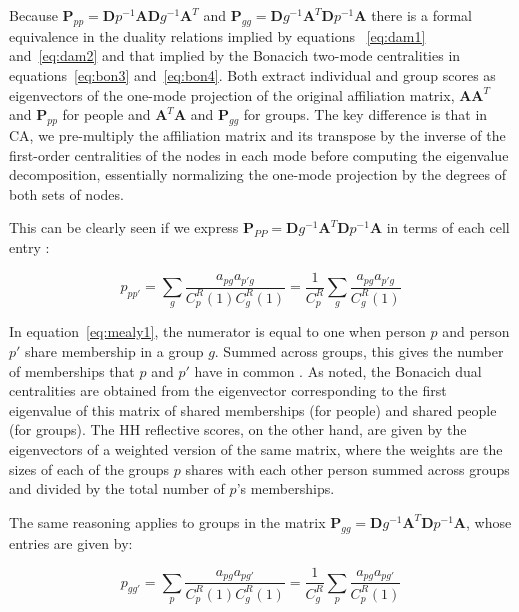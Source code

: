 \documentclass[a4paper,fleqn]{cas-sc}
\begin{document}
Because $\mathbf{P}_{pp} = \mathbf{D}p^{-1}\mathbf{A}\mathbf{D}g^{-1}\mathbf{A}^T$ and $\mathbf{P}_{gg} = \mathbf{D}g^{-1}\mathbf{A}^T\mathbf{D}p^{-1}\mathbf{A}$ there is a formal equivalence in the duality relations implied by equations ~\ref{eq:dam1} and~\ref{eq:dam2} and that implied by the Bonacich two-mode centralities in equations~\ref{eq:bon3} and~\ref{eq:bon4}. Both extract individual and group scores as eigenvectors of the one-mode projection of the original affiliation matrix, $\mathbf{AA}^T$ and $\mathbf{P}_{pp}$ for people and $\mathbf{A}^T\mathbf{A}$ and $\mathbf{P}_{gg}$ for groups. The key difference is that in CA, we pre-multiply the affiliation matrix and its transpose by the inverse of the first-order centralities of the nodes in each mode before computing the eigenvalue decomposition, essentially normalizing the one-mode projection by the degrees of both sets of nodes. 

This can be clearly seen if we express $\mathbf{P}_{PP}= \mathbf{D}g^{-1}\mathbf{A}^T\mathbf{D}p^{-1}\mathbf{A}$ in terms of each cell entry \cite[eq. 4]{mealy2019interpreting}:

\begin{equation}
    p_{pp'} = \sum_g\frac{a_{pg}a_{p'g}}{C^R_p(1)C^R_g(1)} = 
    \frac{1}{C^R_p}\sum_g\frac{a_{pg}a_{p'g}}{C^R_g(1)}
    \label{eq:mealy1}
\end{equation}

In equation~\ref{eq:mealy1}, the numerator is equal to one when person $p$ and person $p'$ share membership in a group $g$. Summed across groups, this gives the number of memberships that $p$ and $p'$ have in common \citep{breiger1974duality}. As noted, the Bonacich dual centralities are obtained from the eigenvector corresponding to the first eigenvalue of this matrix of shared memberships (for people) and shared people (for groups). The HH reflective scores, on the other hand, are given by the eigenvectors of a weighted version of the same matrix, where the weights are the sizes of each of the groups $p$ shares with each other person summed across groups and divided by the total number of $p$'s memberships. 

The same reasoning applies to groups in the matrix $\mathbf{P}_{gg} = \mathbf{D}g^{-1}\mathbf{A}^T\mathbf{D}p^{-1}\mathbf{A}$, whose entries are given by:

\begin{equation}
    p_{gg'} = \sum_p\frac{a_{pg}a_{pg'}}{C^R_p(1)C^R_g(1)} = 
    \frac{1}{C^R_g}\sum_p\frac{a_{pg}a_{pg'}}{C^R_p(1)}
    \label{eq:mealy2}
\end{equation}
\end{document}
